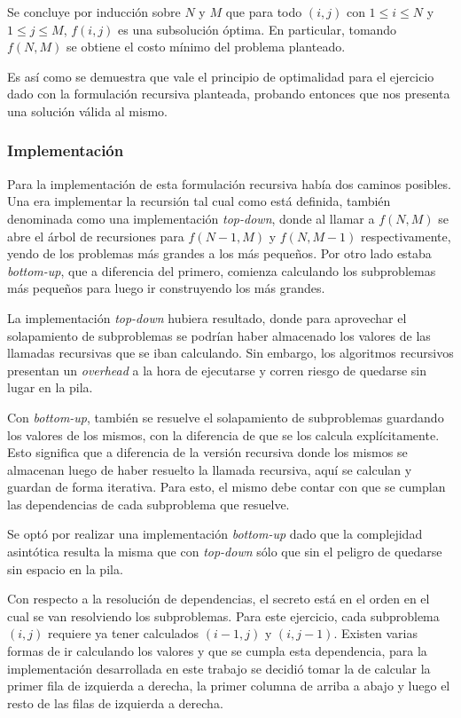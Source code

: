 	Se concluye por inducción sobre $N$ y $M$ que para todo $(i, j)$ con $1 \leq
	i \leq N$ y $1 \leq j \leq M$, $f(i, j)$ es una subsolución óptima. En
	particular, tomando $f(N, M)$ se obtiene el costo mínimo del problema
	planteado.

	Es así como se demuestra que vale el principio de optimalidad para el
	ejercicio dado con la formulación recursiva planteada, probando entonces que
	nos presenta una solución válida al mismo.

	\subsubsection{Implementación}

	Para la implementación de esta formulación recursiva había dos caminos
	posibles. Una era implementar la recursión tal cual como está definida,
	también denominada como una implementación \emph{top-down}, donde al llamar a $f(N,
	M)$ se abre el árbol de recursiones para $f(N - 1, M)$ y $f(N, M - 1)$
	respectivamente, yendo de los problemas más grandes a los más pequeños. Por
	otro lado estaba \emph{bottom-up}, que a diferencia del primero, comienza
	calculando los subproblemas más pequeños para luego ir construyendo los más
	grandes.

	La implementación \emph{top-down} hubiera resultado, donde para aprovechar
	el solapamiento de subproblemas se podrían haber almacenado los valores de
	las llamadas recursivas que se iban calculando. Sin embargo, los algoritmos
	recursivos presentan un \emph{overhead} a la hora de ejecutarse y corren
	riesgo de quedarse sin lugar en la pila.

	Con \emph{bottom-up}, también se resuelve el solapamiento de subproblemas
	guardando los valores de los mismos, con la diferencia de que se los calcula
	explícitamente. Esto significa que a diferencia de la versión recursiva
	donde los mismos se almacenan luego de haber resuelto la llamada recursiva,
	aquí se calculan y guardan de forma iterativa. Para esto, el mismo debe
	contar con que se cumplan las dependencias de cada subproblema que resuelve.

	Se optó por realizar una implementación \emph{bottom-up} dado que la
	complejidad asintótica resulta la misma que con \emph{top-down} sólo que sin el peligro
	de quedarse sin espacio en la pila.

	Con respecto a la resolución de dependencias, el secreto está en el orden en
	el cual se van resolviendo los subproblemas. Para este ejercicio, cada
	subproblema $(i, j)$ requiere ya tener calculados $(i - 1, j)$ y $(i, j -
	1)$. Existen varias formas de ir calculando los valores y que se cumpla esta
	dependencia, para la implementación desarrollada en este trabajo se decidió
	tomar la de calcular la primer fila de izquierda a derecha, la primer
	columna de arriba a abajo y luego el resto de las filas de izquierda a
	derecha.

